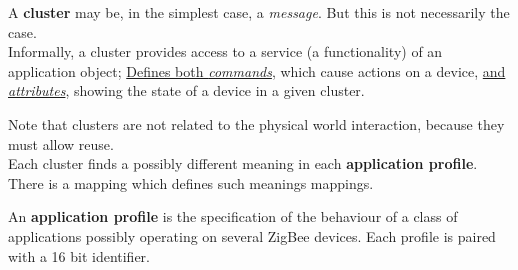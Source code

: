 \begin{paracol}{2}
   A \textbf{cluster} may be, in the simplest case, a \textit{message}. But this is not necessarily the case.\\
   Informally, a cluster provides access to a service (a functionality) of an application object;
   \ul{Defines both \textit{commands}}, which cause actions on a device, \ul{and \textit{attributes}}, showing the state of a device in a given cluster.\\
   
   Note that clusters are not related to the physical world interaction, because they must allow reuse.\\
   Each cluster finds a possibly different meaning in each \textbf{application profile}. There is a mapping which defines such meanings mappings.
   
   An \textbf{application profile} is the specification of the
   behaviour of a class of applications possibly operating
   on several ZigBee devices.
   Each profile is paired with a 16 bit identifier.
   \switchcolumn


\end{paracol}
